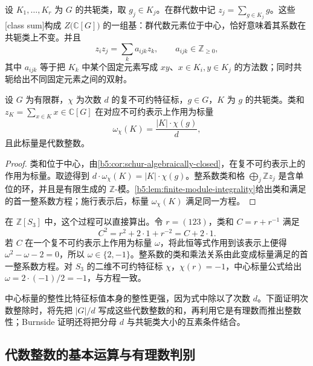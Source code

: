 设 \(K_1,\ldots,K_r\) 为 \(G\) 的共轭类，取 \(g_j\in K_j\)。在群代数中记 \(z_j=\sum_{g\in K_j}g\)。这些[class sum]构成 \(Z\bigl(\mathbb C[G]\bigr)\) 的一组基：群代数元素位于中心，恰好意味着其系数在共轭类上不变。并且
\[
	z_i z_j=\sum_k a_{ijk}z_k,\qquad a_{ijk}\in\mathbb Z_{\ge0},
\]
其中 \(a_{ijk}\) 等于把 \(K_k\) 中某个固定元素写成 \(xy\)、\(x\in K_i,y\in K_j\) 的方法数；同时共轭给出不同固定元素之间的双射。

\begin{proposition}[中心标量的整性]\label{b5:prop:central-character-integrality}
	设 \(G\) 为有限群，\(\chi\) 为次数 \(d\) 的复不可约特征标，\(g\in G\)，\(K\) 为 \(g\) 的共轭类。类和 \(z_K=\sum_{x\in K}x\in\mathbb C[G]\) 在对应不可约表示上作用为标量
	\[
		\omega_\chi(K)=\frac{|K|\cdot\chi(g)}{d},
	\]
	且此标量是代数整数。
\end{proposition}
\begin{proof}
	类和位于中心，由\cref{b5:cor:schur-algebraically-closed}，在复不可约表示上的作用为标量。取迹得到 \(d\cdot\omega_\chi(K)=|K|\cdot\chi(g)\)。整系数类和格 \(\bigoplus_j\mathbb Zz_j\) 是含单位的环，并且是有限生成的 \(\mathbb Z\)-模。\cref{b5:lem:finite-module-integrality}给出类和满足的首一整系数方程；施行表示后，标量 \(\omega_\chi(K)\) 满足同一方程。
\end{proof}

在 \(\mathbb Z[S_3]\) 中，这个过程可以直接算出。令 \(r=(123)\)，类和 \(C=r+r^{-1}\) 满足
\[
	C^2=r^2+2\cdot1+r^{-2}=C+2\cdot1.
\]
若 \(C\) 在一个复不可约表示上作用为标量 \(\omega\)，将此恒等式作用到该表示上便得 \(\omega^2-\omega-2=0\)，所以 \(\omega\in\{2,-1\}\)。整系数的类和乘法关系由此变成标量满足的首一整系数方程。对 \(S_3\) 的二维不可约特征标 \(\chi\)，\(\chi(r)=-1\)，中心标量公式给出 \(\omega=2\cdot(-1)/2=-1\)，与方程一致。

\ProseParagraphBreak
中心标量的整性比特征标值本身的整性更强，因为式中除以了次数 \(d\)。下面证明次数整除时，将先把 \(|G|/d\) 写成这些代数整数的和，再利用它是有理数而推出整数性；Burnside 证明还将把分母 \(d\) 与共轭类大小的互素条件结合。

\subsection{代数整数的基本运算与有理数判别}
\label{b5:subsec:0501:06}

